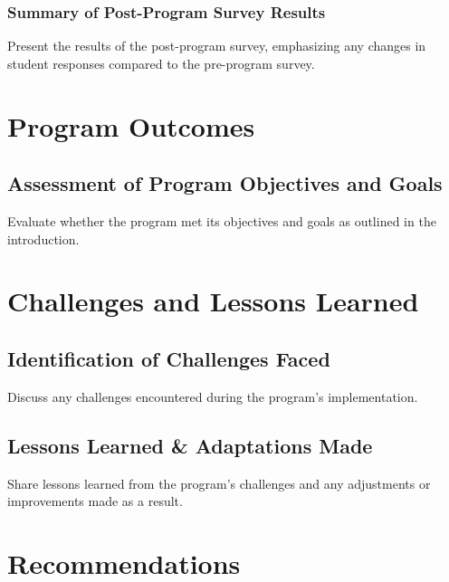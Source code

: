 \documentclass[
]{article}
\begin{document}
\hypertarget{summary-of-post-program-survey-results}{%
\subsubsection{Summary of Post-Program Survey
Results}\label{summary-of-post-program-survey-results}}

Present the results of the post-program survey, emphasizing any changes
in student responses compared to the pre-program survey.

\hypertarget{program-outcomes}{%
\section{Program Outcomes}\label{program-outcomes}}

\hypertarget{assessment-of-program-objectives-and-goals}{%
\subsection{Assessment of Program Objectives and
Goals}\label{assessment-of-program-objectives-and-goals}}

Evaluate whether the program met its objectives and goals as outlined in
the introduction.

\hypertarget{challenges-and-lessons-learned}{%
\section{Challenges and Lessons
Learned}\label{challenges-and-lessons-learned}}

\hypertarget{identification-of-challenges-faced}{%
\subsection{Identification of Challenges
Faced}\label{identification-of-challenges-faced}}

Discuss any challenges encountered during the program's implementation.

\hypertarget{lessons-learned-adaptations-made}{%
\subsection{Lessons Learned \& Adaptations
Made}\label{lessons-learned-adaptations-made}}

Share lessons learned from the program's challenges and any adjustments
or improvements made as a result.

\hypertarget{recommendations}{%
\section{Recommendations}\label{recommendations}}
\end{document}
